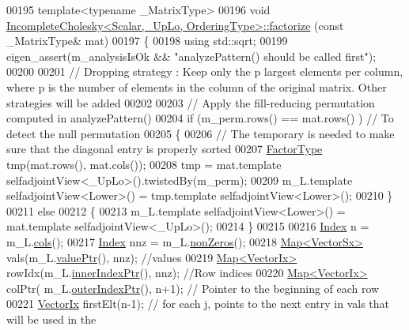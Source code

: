 \begin{DoxyCode}
00195 \textcolor{keyword}{template}<\textcolor{keyword}{typename} \_MatrixType>
00196 \textcolor{keywordtype}{void} \hyperlink{class_eigen_1_1_incomplete_cholesky_ac39c75ff7ca5d2db9a9f03b937e12601}{IncompleteCholesky<Scalar,\_UpLo, OrderingType>::factorize}
      (\textcolor{keyword}{const} \_MatrixType& mat)
00197 \{
00198   \textcolor{keyword}{using} std::sqrt;
00199   eigen\_assert(m\_analysisIsOk && \textcolor{stringliteral}{"analyzePattern() should be called first"}); 
00200     
00201   \textcolor{comment}{// Dropping strategy : Keep only the p largest elements per column, where p is the number of elements in
       the column of the original matrix. Other strategies will be added}
00202   
00203   \textcolor{comment}{// Apply the fill-reducing permutation computed in analyzePattern()}
00204   \textcolor{keywordflow}{if} (m\_perm.rows() == mat.rows() ) \textcolor{comment}{// To detect the null permutation}
00205   \{
00206     \textcolor{comment}{// The temporary is needed to make sure that the diagonal entry is properly sorted}
00207     \hyperlink{group___sparse_core___module}{FactorType} tmp(mat.rows(), mat.cols());
00208     tmp = mat.template selfadjointView<\_UpLo>().twistedBy(m\_perm);
00209     m\_L.template selfadjointView<Lower>() = tmp.template selfadjointView<Lower>();
00210   \}
00211   \textcolor{keywordflow}{else}
00212   \{
00213     m\_L.template selfadjointView<Lower>() = mat.template selfadjointView<\_UpLo>();
00214   \}
00215   
00216   \hyperlink{namespace_eigen_a62e77e0933482dafde8fe197d9a2cfde}{Index} n = m\_L.\hyperlink{group___sparse_core___module_aa391750e3c530227e4a5c3c52e959975}{cols}(); 
00217   \hyperlink{namespace_eigen_a62e77e0933482dafde8fe197d9a2cfde}{Index} nnz = m\_L.\hyperlink{group___sparse_core___module_a03de8b3da2c142ce8698a76123b3e7d3}{nonZeros}();
00218   \hyperlink{group___core___module_class_eigen_1_1_map}{Map<VectorSx>} vals(m\_L.\hyperlink{group___sparse_core___module_a9d4354d3f4d121d764bbed33cac05329}{valuePtr}(), nnz);         \textcolor{comment}{//values}
00219   \hyperlink{group___core___module_class_eigen_1_1_map}{Map<VectorIx>} rowIdx(m\_L.\hyperlink{group___sparse_core___module_ae7b804bd39745156d20ca1611a296b67}{innerIndexPtr}(), nnz);  \textcolor{comment}{//Row indices}
00220   \hyperlink{group___core___module_class_eigen_1_1_map}{Map<VectorIx>} colPtr( m\_L.\hyperlink{group___sparse_core___module_a75506964d86d6badb32d0b4917acf2e2}{outerIndexPtr}(), n+1); \textcolor{comment}{// Pointer to the beginning of
       each row}
00221   \hyperlink{group___core___module}{VectorIx} firstElt(n-1); \textcolor{comment}{// for each j, points to the next entry in vals that will be used in the
}
\end{DoxyCode}
